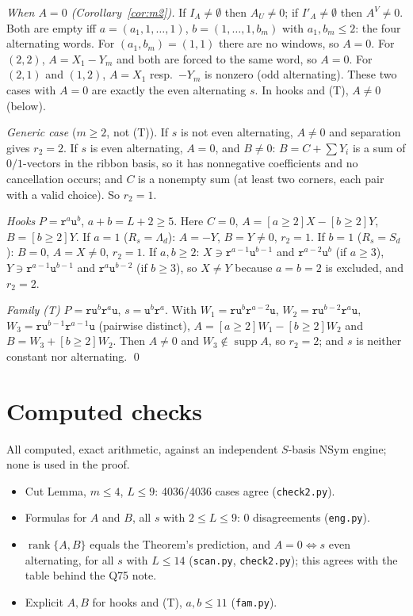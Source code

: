 \documentclass[11pt]{amsart}
\newcommand{\gr}[1]{\textsf{#1}}
\newcommand{\NSym}{\mathrm{NSym}}
\newcommand{\tr}{\mathtt{r}}
\newcommand{\tu}{\mathtt{u}}
\newcommand{\supp}{\operatorname{supp}}
\theoremstyle{plain}
\theoremstyle{definition}
\begin{document}
\emph{When $A=0$ (Corollary~\ref{cor:m2}).} If $I_A\ne\emptyset$ then $A_U\ne0$; if $I'_A\ne\emptyset$ then $A^V\ne0$. Both are empty iff $a=(a_1,1,\dots,1)$, $b=(1,\dots,1,b_m)$ with $a_1,b_m\le2$: the four alternating words. For $(a_1,b_m)=(1,1)$ there are no windows, so $A=0$. For $(2,2)$, $A=X_1-Y_m$ and both are forced to the same word, so $A=0$. For $(2,1)$ and $(1,2)$, $A=X_1$ resp.\ $-Y_m$ is nonzero (odd alternating). These two cases with $A=0$ are exactly the even alternating $s$. In hooks and (T), $A\ne0$ (below).

\emph{Generic case} ($m\ge2$, not (T)). If $s$ is not even alternating, $A\ne0$ and separation gives $r_2=2$. If $s$ is even alternating, $A=0$, and $B\ne0$: $B=C+\sum Y_i$ is a sum of $0/1$-vectors in the ribbon basis, so it has nonnegative coefficients and no cancellation occurs; and $C$ is a nonempty sum (at least two corners, each pair with a valid choice). So $r_2=1$.

\emph{Hooks} $P=\tr^a\tu^b$, $a+b=L+2\ge5$. Here $C=0$, $A=[a\ge2]X-[b\ge2]Y$, $B=[b\ge2]Y$. If $a=1$ ($R_s=\Lambda_d$): $A=-Y$, $B=Y\ne0$, $r_2=1$. If $b=1$ ($R_s=S_d$): $B=0$, $A=X\ne0$, $r_2=1$. If $a,b\ge2$: $X\ni\tr^{a-1}\tu^{b-1}$ and $\tr^{a-2}\tu^b$ (if $a\ge3$), $Y\ni\tr^{a-1}\tu^{b-1}$ and $\tr^a\tu^{b-2}$ (if $b\ge3$), so $X\ne Y$ because $a=b=2$ is excluded, and $r_2=2$.

\emph{Family (T)} $P=\tr\tu^b\tr^a\tu$, $s=\tu^b\tr^a$. With $W_1=\tr\tu^b\tr^{a-2}\tu$, $W_2=\tr\tu^{b-2}\tr^a\tu$, $W_3=\tr\tu^{b-1}\tr^{a-1}\tu$ (pairwise distinct), $A=[a\ge2]W_1-[b\ge2]W_2$ and $B=W_3+[b\ge2]W_2$. Then $A\ne0$ and $W_3\notin\supp A$, so $r_2=2$; and $s$ is neither constant nor alternating. \qed

\section{Computed checks}\label{sec:checks}
All \gr{computed}, exact arithmetic, against an independent $S$-basis $\NSym$ engine; none is used in the proof.
\begin{itemize}[leftmargin=1.2em,itemsep=1pt]
\item Cut Lemma, $m\le4$, $L\le9$: 4036/4036 cases agree (\texttt{check2.py}).
\item Formulas for $A$ and $B$, all $s$ with $2\le L\le9$: 0 disagreements (\texttt{eng.py}).
\item $\operatorname{rank}\{A,B\}$ equals the Theorem's prediction, and $A=0\iff s$ even alternating, for all $s$ with $L\le14$ (\texttt{scan.py}, \texttt{check2.py}); this agrees with the table behind the Q75 note.
\item Explicit $A,B$ for hooks and (T), $a,b\le11$ (\texttt{fam.py}).
\end{itemize}
\end{document}

